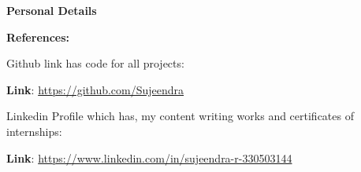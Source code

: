 \documentclass[12pt]{article}
\begin{document}
\vspace{\baselineskip}
{\fontsize{14pt}{16.8pt}\selectfont \textbf{Personal Details}\par}\par

\par

\par

\par

\par

\par

\vspace{\baselineskip}
{\fontsize{14pt}{16.8pt}\selectfont \textbf{References:}\par}\par

{\fontsize{13pt}{15.6pt}\selectfont Github link has code for all projects:\par}\par


	 {\fontsize{13pt}{15.6pt}\selectfont \textbf{Link}: \href{https://github.com/Sujeendra}{https://github.com/Sujeendra}\par}\par


\vspace{\baselineskip}
{\fontsize{13pt}{15.6pt}\selectfont Linkedin Profile which has, my content writing works and certificates of internships:\par}\par
	 {\fontsize{13pt}{15.6pt}\selectfont \textbf{Link}: \href{https://www.linkedin.com/in/sujeendra-r-330503144}{https://www.linkedin.com/in/sujeendra-r-330503144}\par}\par
\end{document}
